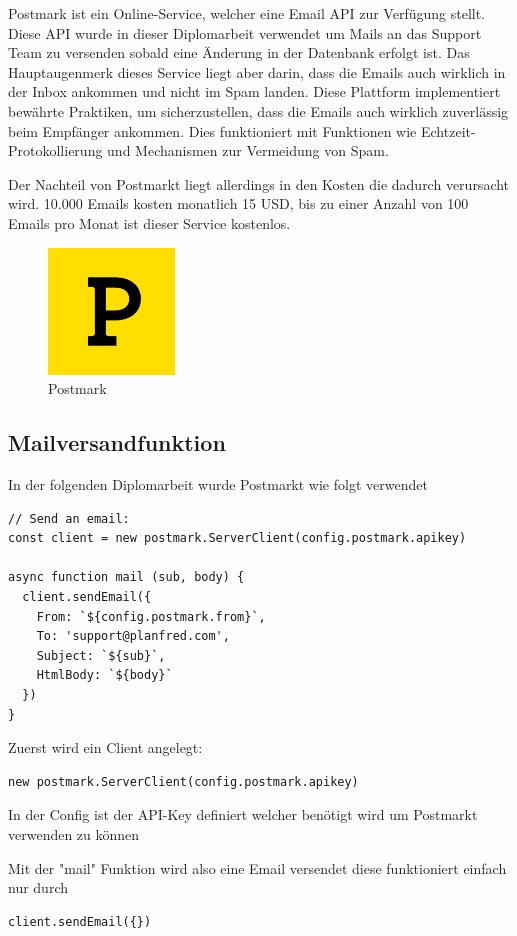 Postmark ist ein Online-Service, welcher eine Email API zur Verfügung stellt. Diese API wurde in dieser Diplomarbeit verwendet um Mails an das Support Team zu versenden sobald eine Änderung in der Datenbank erfolgt ist. Das Hauptaugenmerk dieses Service liegt aber darin, dass die Emails auch wirklich in der Inbox ankommen und nicht im Spam landen. Diese Plattform implementiert bewährte Praktiken, um sicherzustellen, dass die Emails auch wirklich zuverlässig beim Empfänger ankommen. Dies funktioniert mit Funktionen wie Echtzeit-Protokollierung und Mechanismen zur Vermeidung von Spam.

Der Nachteil von Postmarkt liegt allerdings in den Kosten die dadurch verursacht wird. 10.000 Emails kosten monatlich 15 USD, bis zu einer Anzahl von 100 Emails pro Monat ist dieser Service kostenlos.

\begin{figure}[h!]
    \centering
    \includegraphics[width=0.3\textwidth]{pics/postmark.png}
    \caption{Postmark}
    \label{fig:enter-label}
\end{figure}


\subsection{Mailversandfunktion}

In der folgenden Diplomarbeit wurde Postmarkt wie folgt verwendet


\begin{lstlisting}
// Send an email:
const client = new postmark.ServerClient(config.postmark.apikey)

async function mail (sub, body) {
  client.sendEmail({
    From: `${config.postmark.from}`,
    To: 'support@planfred.com',
    Subject: `${sub}`,
    HtmlBody: `${body}`
  })
}
\end{lstlisting}

Zuerst wird ein Client angelegt:
\begin{lstlisting}
new postmark.ServerClient(config.postmark.apikey)
\end{lstlisting}
In der Config ist der API-Key definiert welcher benötigt wird um Postmarkt verwenden zu können

Mit der "mail" Funktion wird also eine Email versendet diese funktioniert einfach nur durch 
\begin{lstlisting}
client.sendEmail({})
\end{lstlisting}
